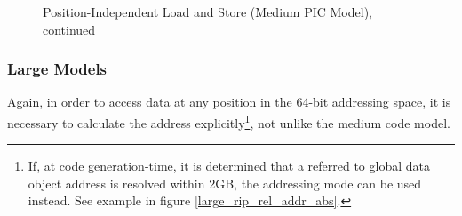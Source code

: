 \begin{figure}[H]
\Hrule
\caption{Position-Independent Load and Store (Medium PIC Model), continued}
\begin{center}
\end{center}
\Hrule
\end{figure}

\subsubsection{Large Models}

Again, in order to access data at any position in the 64-bit
addressing space, it is necessary to calculate the address
explicitly\footnote{ If, at code generation-time, it is
determined that a referred to global data object address is
resolved within 2GB, the  addressing
mode can be used instead. See example in figure
\ref{large_rip_rel_addr_abs}.}, not unlike the medium code
model.

